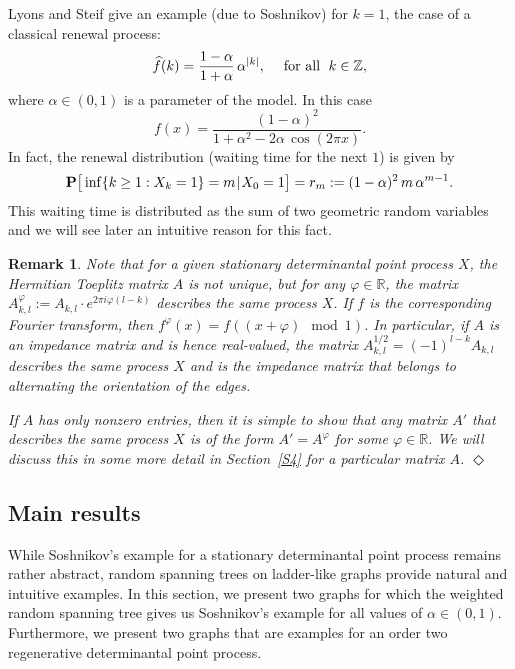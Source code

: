 \documentclass[11pt]{article}
\providecommand{\1}{\mathBB{1}}
\newcommand{\mfa}{\quad\mbox{\;for all \;}}
\renewcommand{\P}{\mathbf{P}}
\def\given{\hspace{0.8pt}|\hspace{0.8pt}}
\newcommand{\R}{{\mathbb{R}}}
\newcommand{\Z}{{\mathbb{Z}}}
\def\hatf{\widehat f}
\newtheorem{uremark}[proposition]{Remark}
\newenvironment{remark}{\begin{uremark}\em}{\hfill$\Diamond$\end{uremark}}
\begin{document}
Lyons and Steif give an example (due to Soshnikov) for $k=1$, the case of a classical renewal process: \begin{equation}
\label{E1.07}
\hatf(k)=\frac{1-\alpha}{1+\alpha}\,\alpha^{|k|},\mfa k\in\Z,
\end{equation}
where $\alpha\in(0,1)$ is a parameter of the model. In this case
$$f(x)=\frac{(1-\alpha)^2}{1+\alpha^2-2\alpha\,\cos(2\pi x)}.$$
In fact, the renewal distribution (waiting time for the next $1$) is given by
\begin{equation}
\label{E1.08}
\P\big[\inf\{k\geq1:X_k=1\}=m\given X_0=1\big]=r_m:=
(1-\alpha)^2\,m\,\alpha^{m-1}.
\end{equation}
This waiting time is distributed as the sum of two geometric random variables and we will see later an intuitive reason for this fact.

\begin{remark}
\label{R1.2}
Note that for a given stationary determinantal point process $X$, the Hermitian Toeplitz matrix $A$ is not unique, but for any $\varphi\in\R$, the matrix $A^\varphi_{k,l}:=A_{k,l}\cdot e^{2\pi i\varphi(l-k)}$ describes the same process $X$. If $f$ is the corresponding Fourier transform, then $f^\varphi(x)=f((x+\varphi)\mod 1)$. In particular, if $A$ is an impedance matrix and is hence real-valued, the matrix $A^{1/2}_{k,l}=(-1)^{l-k}A_{k,l}$ describes the same process $X$ and is the impedance matrix that belongs to alternating the orientation of the edges.

If $A$ has only nonzero entries, then it is simple to show that any matrix $A'$ that describes the same process $X$ is of the form $A'=A^\varphi$ for some $\varphi\in\R$. We will discuss this in some more detail in Section~\ref{S4} for a particular matrix $A$.
\end{remark}

\subsection{Main results}
\label{S1.3}
While Soshnikov's example for a stationary determinantal point process remains rather abstract, random spanning trees on ladder-like graphs provide natural and intuitive examples. In this section, we present two graphs for which the weighted random spanning tree gives us Soshnikov's example for all values of $\alpha\in(0,1)$. Furthermore, we present two graphs that are examples for an order two regenerative determinantal point process.
\end{document}
